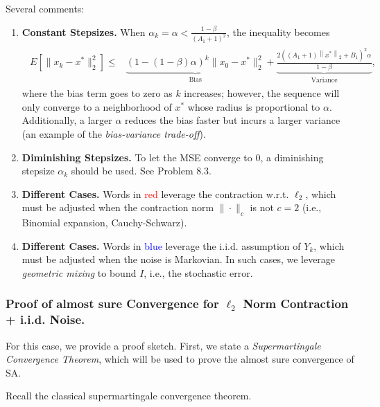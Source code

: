 \documentclass[11pt,twoside]{article}
\begin{document}
\begin{remark} Several comments:
    \begin{enumerate}
        \item \textbf{Constant Stepsizes.} When $\alpha_k = \alpha < \frac{1-\beta}{(A_1+1)^2}$, the inequality becomes
        \begin{align}
        \begin{aligned}
        {E}\left[\|x_k-x^*\|_2^2\right] \leq & \underbrace{\left(1-(1-\beta) \alpha\right)^k \|x_0-x^*\|_2^2}_{\text{Bias}} + \underbrace{\frac{2\left(\left(A_1+1\right)\left\|x^*\right\|_2+B_1\right)^2 \alpha}{1-\beta}}_{\text{Variance}},
        \end{aligned}
        \end{align}
        where the bias term goes to zero as $k$ increases; however, the sequence will only converge to a neighborhood of $x^*$ whose radius is proportional to $\alpha$. Additionally, a larger $\alpha$ reduces the bias faster but incurs a larger variance (an example of the \emph{bias-variance trade-off}).

        \item \textbf{Diminishing Stepsizes.} To let the MSE converge to 0, a diminishing stepsize $\alpha_k$ should be used. See Problem 8.3. 

        \item \textbf{Different Cases.} Words in \textcolor{red}{red} leverage the contraction w.r.t. $\ell_2$, which must be adjusted when the contraction norm $\|\cdot\|_c$ is not $c=2$ (i.e., Binomial expansion, Cauchy-Schwarz).

        \item \textbf{Different Cases.} Words in \textcolor{blue}{blue} leverage the i.i.d. assumption of $Y_k$, which must be adjusted when the noise is Markovian. In such cases, we leverage \emph{geometric mixing} to bound $I$, i.e., the stochastic error.
    \end{enumerate}
\end{remark}
\clearpage
\subsubsection{Proof of almost sure Convergence for $\ell_2$ Norm Contraction + i.i.d. Noise.} For this case, we provide a proof sketch. First, we state a \emph{Supermartingale Convergence Theorem}, which will be used to prove the almost sure convergence of SA.

Recall the classical supermartingale convergence theorem.
\end{document}
